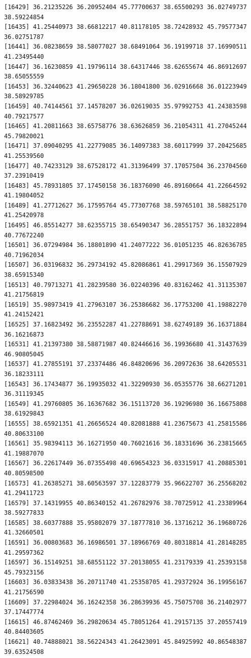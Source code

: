 \documentclass[
  letterpaper,
  DIV=11,
  numbers=noendperiod]{scrartcl}
\begin{document}
\begin{verbatim}
[16429] 36.21235226 36.20952404 45.77700637 38.65500293 36.02749737 38.59224854
[16435] 41.25440973 38.66812217 40.81178105 38.72428932 45.79577347 36.02751787
[16441] 36.08238659 38.58077027 38.68491064 36.19199718 37.16990511 41.23495440
[16447] 36.16230859 41.19796114 38.64317446 38.62655674 46.86912697 38.65055559
[16453] 36.32440623 41.29650228 36.18041800 36.02916668 36.01223949 38.58929785
[16459] 40.74144561 37.14578207 36.02619035 35.97992753 41.24383598 40.79217577
[16465] 41.20811663 38.65758776 38.63626859 36.21054311 41.27045244 45.79820021
[16471] 37.09040295 41.22779085 36.14097383 38.60117999 37.20425685 41.25539560
[16477] 40.74233129 38.67528172 41.31396499 37.17057504 36.23704560 37.23910419
[16483] 45.78931805 37.17450158 36.18376090 46.89160664 41.22664592 41.19804052
[16489] 41.27712627 36.17595764 45.77307768 38.59765101 38.58825170 41.25420978
[16495] 46.85514277 38.62355715 38.65490347 36.28551757 36.18322894 40.77672240
[16501] 36.07294984 36.18801890 41.24077222 36.01051235 46.82636785 40.71962034
[16507] 36.03196832 36.29734192 45.82086861 41.29917369 36.15507929 38.65915340
[16513] 40.79713271 41.28239580 36.02240396 40.83162462 41.31135307 41.21756819
[16519] 35.98973419 41.27963107 36.25386682 36.17753200 41.19882270 41.24152421
[16525] 37.16823492 36.23552287 41.22788691 38.62749189 36.16371884 36.16216873
[16531] 41.21397380 38.58871987 40.82446616 36.19936680 41.31437639 46.90805045
[16537] 41.27855191 37.23374486 46.84820696 36.20972636 38.64205531 36.18233111
[16543] 36.17434877 36.19935032 41.32290930 36.05355776 38.66271201 36.31119345
[16549] 41.29760805 36.16367682 36.15113720 36.19296980 36.16675808 38.61929843
[16555] 38.65921351 41.26656524 40.82081888 41.23675673 41.25815586 40.80633100
[16561] 35.98394113 36.16271950 40.76021616 36.18331696 36.23815665 41.19887070
[16567] 36.22617449 36.07355498 40.69654323 36.03315917 41.20885301 40.80598500
[16573] 41.26385271 38.60563597 37.12283779 35.96622707 36.25568202 41.29411723
[16579] 37.14319955 40.86340152 41.26782976 38.70725912 41.23389964 38.59277833
[16585] 38.60377888 35.95802079 37.18777810 36.13716212 36.19680726 41.32660501
[16591] 36.00803683 36.16986501 37.18966769 40.80318814 41.28148285 41.29597362
[16597] 36.15149251 38.68551122 37.20138055 41.23179339 41.25393158 45.79323156
[16603] 36.03833438 36.20711740 41.25358705 41.29372924 36.19956167 41.21756590
[16609] 37.22984024 36.16242358 36.28639936 45.75075708 36.21402977 37.17447774
[16615] 46.87462469 36.29820634 45.78051264 41.29157135 37.20557419 40.84403605
[16621] 40.74888021 38.56224343 41.26423091 45.84925992 40.86548387 39.63524508

\end{verbatim}
\end{document}
